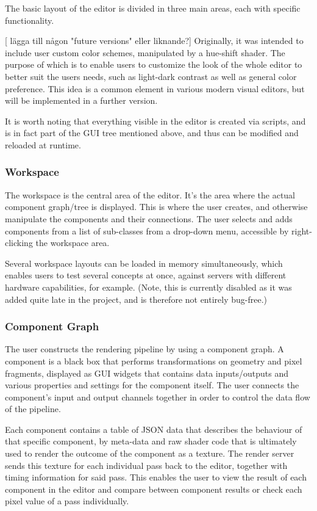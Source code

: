 The basic layout of the editor is divided in three main areas, each with specific functionality.  

[ lägga till någon "future versions" eller liknande?]
Originally, it was intended to include user custom color schemes, manipulated by a hue-shift shader. The purpose of which is to enable users to customize the look of the whole editor to better suit the users needs, such as light-dark contrast as well as general color preference. This idea is a common element in various modern visual editors, but will be implemented in a further version. 

It is worth noting that everything visible in the editor is created via scripts, and is in fact part of the GUI tree mentioned above, and thus can be modified and reloaded at runtime.

\subsubsection{Workspace}
The workspace is the central area of the editor. It's the area where the actual component graph/tree is displayed. This is where the user creates, and otherwise manipulate the components and their connections. The user selects and adds components from a list of sub-classes from a drop-down menu, accessible by right-clicking the workspace area. 

Several workspace layouts can be loaded in memory simultaneously, which enables users to test several concepts at once, against servers with different hardware capabilities, for example. (Note, this is currently disabled as it was added quite late in the project, and is therefore not entirely bug-free.)

\subsubsection{Component Graph}
The user constructs the rendering pipeline by using a component graph. A component is a black box that performs transformations on geometry and pixel fragments, displayed as GUI widgets that contains data inputs/outputs and various properties and settings for the component itself. The user connects the component’s input and output channels together in order to control the data flow of the pipeline. 

Each component contains a table of JSON data that describes the behaviour of that specific component, by meta-data and raw shader code that is ultimately used to render the outcome of the component as a texture. The render server sends this texture for each individual pass back to the editor, together with timing information for said pass. This enables the user to view the result of each component in the editor and compare between component results or check each pixel value of a pass individually. 


